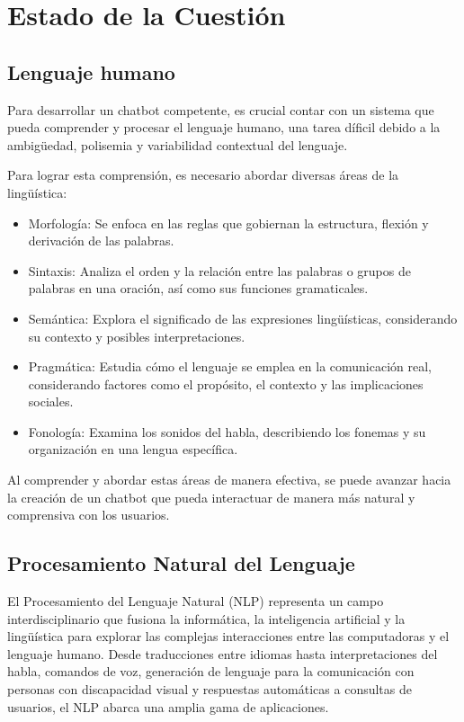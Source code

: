 \chapter{Estado de la Cuestión}
\label{cap:estadoDeLaCuestion}


\section{Lenguaje humano}
Para desarrollar un chatbot competente, es crucial contar con un sistema que pueda comprender y procesar el lenguaje humano, una tarea díficil debido a la ambigüedad, polisemia y variabilidad contextual del lenguaje.

Para lograr esta comprensión, es necesario abordar diversas áreas de la lingüística:
\begin{itemize}
	\item Morfología: Se enfoca en las reglas que gobiernan la estructura, flexión y derivación de las palabras.
	\item Sintaxis: Analiza el orden y la relación entre las palabras o grupos de palabras en una oración, así como sus funciones gramaticales.
	\item Semántica: Explora el significado de las expresiones lingüísticas, considerando su contexto y posibles interpretaciones.
	\item Pragmática: Estudia cómo el lenguaje se emplea en la comunicación real, considerando factores como el propósito, el contexto y las implicaciones sociales.
	\item Fonología: Examina los sonidos del habla, describiendo los fonemas y su organización en una lengua específica.
\end{itemize}


Al comprender y abordar estas áreas de manera efectiva, se puede avanzar hacia la creación de un chatbot que pueda interactuar de manera más natural y comprensiva con los usuarios.
\section{Procesamiento Natural del Lenguaje}
El Procesamiento del Lenguaje Natural (NLP) representa un campo interdisciplinario que fusiona la informática, la inteligencia artificial y la lingüística para explorar las complejas interacciones entre las computadoras y el lenguaje humano. Desde traducciones entre idiomas hasta interpretaciones del habla, comandos de voz, generación de lenguaje para la comunicación con personas con discapacidad visual y respuestas automáticas a consultas de usuarios, el NLP abarca una amplia gama de aplicaciones.

